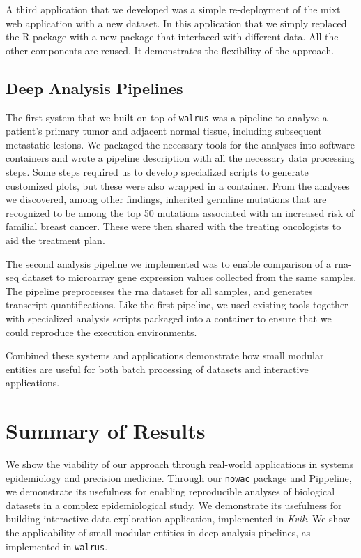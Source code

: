 A third application that we developed was a simple re-deployment of the
\gls{mixt} web application with a new dataset. In this application that we
simply replaced the R package with a new package that interfaced with different
data. All the other components are reused. It demonstrates the flexibility of
the approach. 


\subsection{Deep Analysis Pipelines}
The first system that we built on top of \texttt{walrus} was a pipeline to
analyze a patient’s primary tumor and adjacent normal tissue, including
subsequent metastatic lesions.\cite{walrus} We packaged the necessary tools for
the analyses into software containers and wrote a pipeline description with all
the necessary data processing steps. Some steps required us to develop
specialized scripts to generate customized plots, but these were also wrapped in
a container. From the analyses we discovered, among other findings, inherited
germline mutations that are recognized to be among the top 50 mutations
associated with an increased risk of familial breast cancer. These were then
shared with the treating oncologists to aid the treatment plan. 

The second analysis pipeline we implemented was to enable comparison of a
\gls{rna}-seq dataset to microarray gene expression values collected from the
same samples.  The pipeline preprocesses the \gls{rna} dataset for all samples,
and generates transcript quantifications. Like the first pipeline, we used
existing tools together with specialized analysis scripts packaged into a
container to ensure that we could reproduce the execution environments. 

Combined these systems and applications demonstrate how small modular entities
are useful for both batch processing of datasets and interactive
applications. 

\section{Summary of Results} 
We show the viability of our approach through real-world applications in systems
epidemiology and precision medicine. Through our \texttt{nowac} package and
Pippeline, we demonstrate its usefulness for enabling reproducible analyses of
biological datasets in a complex epidemiological study. We demonstrate its
usefulness for building interactive data exploration application, implemented in
\emph{Kvik}. We show the applicability of small modular entities in deep
analysis pipelines, as implemented in \texttt{walrus}.

